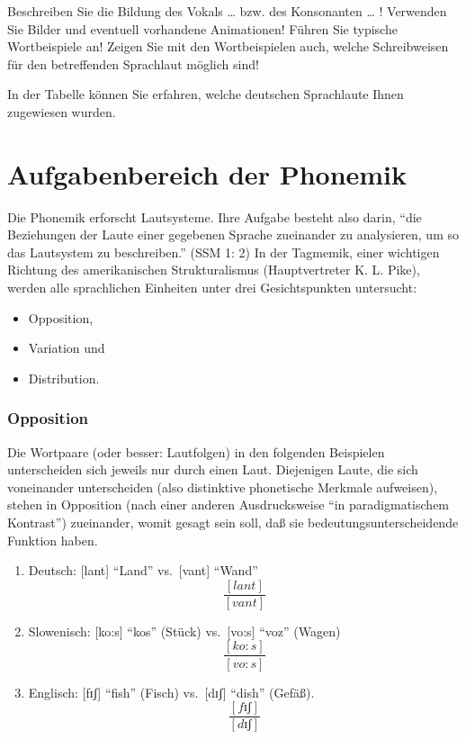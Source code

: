 \documentclass[
  letterpaper,
]{scrbook}
\begin{document}
Beschreiben Sie die Bildung des Vokals \ldots{} bzw. des Konsonanten
\ldots{} ! Verwenden Sie Bilder und eventuell vorhandene Animationen!
Führen Sie typische Wortbeispiele an! Zeigen Sie mit den Wortbeispielen
auch, welche Schreibweisen für den betreffenden Sprachlaut möglich sind!

In der Tabelle können Sie erfahren, welche deutschen Sprachlaute Ihnen
zugewiesen wurden.

\hypertarget{aufgabenbereich-der-phonemik}{%
\chapter{Aufgabenbereich der
Phonemik}\label{aufgabenbereich-der-phonemik}}

Die Phonemik erforscht Lautsysteme. Ihre Aufgabe besteht also darin,
``die Beziehungen der Laute einer gegebenen Sprache zueinander zu
analysieren, um so das Lautsystem zu beschreiben.'' (SSM 1: 2) In der
Tagmemik, einer wichtigen Richtung des amerikanischen Strukturalismus
(Hauptvertreter K. L. Pike), werden alle sprachlichen Einheiten unter
drei Gesichtspunkten untersucht:

\begin{itemize}
\item
  Opposition,
\item
  Variation und
\item
  Distribution.
\end{itemize}

\hypertarget{opposition}{%
\subsection{Opposition}\label{opposition}}

Die Wortpaare (oder besser: Lautfolgen) in den folgenden Beispielen
unterscheiden sich jeweils nur durch einen Laut. Diejenigen Laute, die
sich voneinander unterscheiden (also distinktive phonetische Merkmale
aufweisen), stehen in Opposition (nach einer anderen Ausdrucksweise ``in
paradigmatischem Kontrast'') zueinander, womit gesagt sein soll, daß sie
bedeutungsunterscheidende Funktion haben.

\begin{enumerate}
\def\labelenumi{(\arabic{enumi})}
\setcounter{enumi}{7}
\item
  Deutsch: {[}lant{]} ``Land'' vs.~{[}vant{]} ``Wand''\\
  \[
  \frac{[lant]}{[vant]}
  \]
\item
  Slowenisch: {[}ko:s{]} ``kos'' (Stück) vs.~{[}vo:s{]} ``voz''
  (Wagen)\\
  \[
  \frac{[ko:s]}{[vo:s]}
  \]
\item
  Englisch: {[}fɪʃ{]} ``fish'' (Fisch) vs.~{[}dɪʃ{]} ``dish'' (Gefäß).\\
  \[
  \frac{[fɪʃ]}{[dɪʃ]}
  \]
\end{enumerate}
\end{document}
